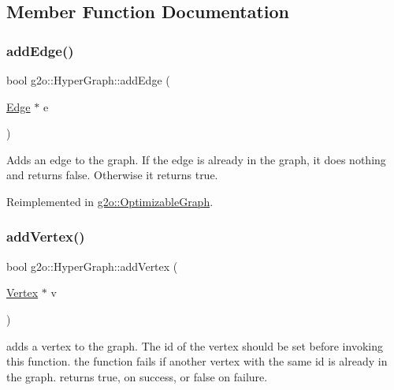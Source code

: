 \subsection{Member Function Documentation}
\mbox{\label{classg2o_1_1_hyper_graph_a0f1d35009a2879b238c8148c33485c89}} 
\subsubsection{\texorpdfstring{add\+Edge()}{addEdge()}}
{\footnotesize\ttfamily bool g2o\+::\+Hyper\+Graph\+::add\+Edge (\begin{DoxyParamCaption}\item[{\mbox{\hyperlink{classg2o_1_1_hyper_graph_1_1_edge}{Edge}} $\ast$}]{e }\end{DoxyParamCaption})\hspace{0.3cm}{\ttfamily [virtual]}}

Adds an edge to the graph. If the edge is already in the graph, it does nothing and returns false. Otherwise it returns true. 

Reimplemented in \mbox{\hyperlink{structg2o_1_1_optimizable_graph_a6831ed69fce3dba691f53302a2813070}{g2o\+::\+Optimizable\+Graph}}.

\mbox{\label{classg2o_1_1_hyper_graph_a7ef87ba3479827b24c6fc29c5fc3aa21}} 
\subsubsection{\texorpdfstring{add\+Vertex()}{addVertex()}}
{\footnotesize\ttfamily bool g2o\+::\+Hyper\+Graph\+::add\+Vertex (\begin{DoxyParamCaption}\item[{\mbox{\hyperlink{classg2o_1_1_hyper_graph_1_1_vertex}{Vertex}} $\ast$}]{v }\end{DoxyParamCaption})\hspace{0.3cm}{\ttfamily [virtual]}}

adds a vertex to the graph. The id of the vertex should be set before invoking this function. the function fails if another vertex with the same id is already in the graph. returns true, on success, or false on failure. 

